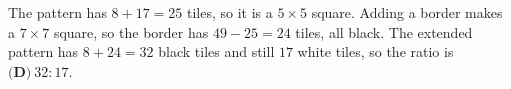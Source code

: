 The pattern has $8+17=25$ tiles, so it is a $5\times5$ square. Adding a border makes a $7\times7$ square, so the border has $49-25=24$ tiles, all black. The extended pattern has $8+24=32$ black tiles and still $17$ white tiles, so the ratio is $\boxed{\textbf{(D)}\ 32:17}$.
